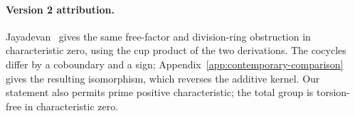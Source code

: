 
\paragraph{Version 2 attribution.}
Jayadevan~\cite{jayadevan-18-76} gives the same free-factor and
division-ring obstruction in characteristic zero, using the cup product
of the two derivations. The cocycles differ by a coboundary and a sign;
Appendix~\ref{app:contemporary-comparison} gives the resulting isomorphism,
which reverses the additive kernel. Our statement also permits prime
positive characteristic; the total group is torsion-free in characteristic zero.
